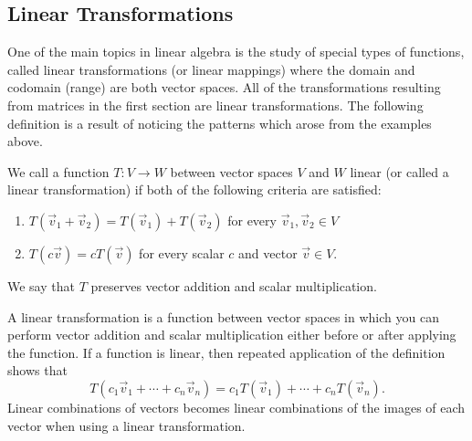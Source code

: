 \subsection{Linear Transformations}
One of the main topics in linear algebra is the study of special types of functions, called linear transformations (or linear mappings) where the domain and codomain (range) are both vector spaces.  All of the transformations resulting from matrices in the first section are linear transformations.  The following definition is a result of noticing the patterns which arose from the examples above.  
\begin{definition}
We call a function $T:V\to W$ between vector spaces $V$ and $W$ linear (or called a linear transformation) if both of the following criteria are satisfied:
\begin{enumerate}
	\item $T(\vec v_1+\vec v_2)=T(\vec v_1)+T(\vec v_2)$ for every $\vec v_1,\vec v_2\in V$
	\item $T(c\vec v)=cT(\vec v)$ for every scalar $c$ and vector $\vec v\in V$.
\end{enumerate}
We say that $T$ preserves vector addition and scalar multiplication.
\end{definition}
A linear transformation is a function between vector spaces in which you can perform vector addition and scalar multiplication  either before or after applying the function. 
If a function is linear, then repeated application of the definition shows that $$T(c_1\vec v_1+\cdots +c_n\vec v_n) = c_1T(\vec v_1)+\cdots +c_nT(\vec v_n).$$ Linear combinations of vectors becomes linear combinations of the images of each vector when using a linear transformation.  

